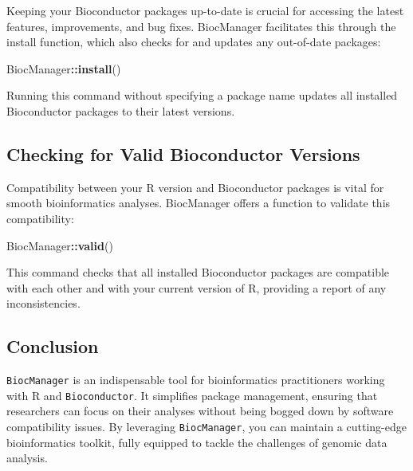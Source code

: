 \documentclass[
]{book}
\newenvironment{Shaded}{\begin{snugshade}}{\end{snugshade}}
\newcommand{\FunctionTok}[1]{\textcolor[rgb]{0.13,0.29,0.53}{\textbf{#1}}}
\newcommand{\NormalTok}[1]{#1}
\newcommand{\SpecialCharTok}[1]{\textcolor[rgb]{0.81,0.36,0.00}{\textbf{#1}}}
\begin{document}
Keeping your Bioconductor packages up-to-date is crucial for accessing the latest features, improvements, and bug fixes. BiocManager facilitates this through the install function, which also checks for and updates any out-of-date packages:

\begin{Shaded}
\begin{Highlighting}[]
\NormalTok{BiocManager}\SpecialCharTok{::}\FunctionTok{install}\NormalTok{()}
\end{Highlighting}
\end{Shaded}

Running this command without specifying a package name updates all installed Bioconductor packages to their latest versions.

\hypertarget{checking-for-valid-bioconductor-versions}{%
\subsection{Checking for Valid Bioconductor Versions}\label{checking-for-valid-bioconductor-versions}}

Compatibility between your R version and Bioconductor packages is vital for smooth bioinformatics analyses. BiocManager offers a function to validate this compatibility:

\begin{Shaded}
\begin{Highlighting}[]
\NormalTok{BiocManager}\SpecialCharTok{::}\FunctionTok{valid}\NormalTok{()}
\end{Highlighting}
\end{Shaded}

This command checks that all installed Bioconductor packages are compatible with each other and with your current version of R, providing a report of any inconsistencies.

\hypertarget{conclusion-26}{%
\subsection{Conclusion}\label{conclusion-26}}

\texttt{BiocManager} is an indispensable tool for bioinformatics practitioners working with R and \texttt{Bioconductor}. It simplifies package management, ensuring that researchers can focus on their analyses without being bogged down by software compatibility issues. By leveraging \texttt{BiocManager}, you can maintain a cutting-edge bioinformatics toolkit, fully equipped to tackle the challenges of genomic data analysis.
\end{document}
